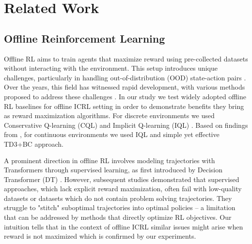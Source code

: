 \documentclass{article} %
\begin{document}


\appendix


\section{Related Work}
\label{related}
\subsection{Offline Reinforcement Learning}
Offline RL aims to train agents that maximize reward using pre-collected datasets without interacting with the environment. This setup introduces unique challenges, particularly in handling out-of-distribution (OOD) state-action pairs \citep{levine2020offline}. Over the years, this field has witnessed rapid development, with various methods proposed to address these challenges \citep{kumar2020conservative, an2021uncertainty, kostrikov2021offline, fujimoto2021minimalist}. In our study we test widely adopted offline RL baselines for offline ICRL setting in order to demonstrate benefits they bring as reward maximization algorithms. For discrete environments we used Conservative Q-learning (CQL) \citep{kumar2020conservative} and Implicit Q-learning (IQL) \citep{kostrikov2021offline}. Based on findings from \citet{tarasov2024corl}, for continuous environments we used IQL and simple yet effective \citep{tarasov2024revisiting} TD3+BC \citep{fujimoto2021minimalist} approach.

A prominent direction in offline RL involves modeling trajectories with Transformers through supervised learning, as first introduced by Decision Transformer (DT) \citep{chen2021decision}. However, subsequent studies \citep{yamagata2023q, hu2024q, zhuang2024reinformer} demonstrated that supervised approaches, which lack explicit reward maximization, often fail with low-quality datasets or datasets which do not contain problem solving trajectories. They struggle to "stitch" suboptimal trajectories into optimal policies -- a limitation that can be addressed by methods that directly optimize RL objectives. Our intuition tells that in the context of offline ICRL similar issues might arise when reward is not maximized which is confirmed by our experiments.
\end{document}
